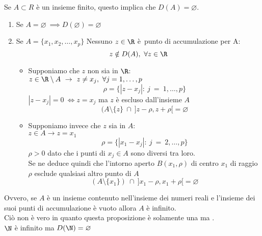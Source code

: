 \documentclass[../analisi.tex]{subfiles}
\begin{document}
\begin{dimo}
Se $A \subset R$ è un insieme finito, questo implica che $D(A) = \varnothing$.\\

\begin{enumerate}

\item 
Se $A = \varnothing\ \implies D(\varnothing) = \varnothing$

\item 
Se $A = \{ x_1, x_2, \dots, x_p \}$ Nessuno $ z \in \R$ 
è punto di accumulazione per A:
\begin{equation}
	z \notin D(A),\ \forall z \in \R
\end{equation}	

	\begin{itemize}
	\item 
	
	Supponiamo che $z$ non sia in $\R$: \\
	$ z \in \R \setminus A\ \to\ z \neq x_j,\ \forall j = 1, \dots, p$
	\begin{equation}
	\rho = \{ | z - x_j |:\ j\ =\ 1, \dots, p \}
	\end{equation}
	$ | z - x_j | = 0 \ \iff z = x_j $ ma $z$ è escluso dall'insieme $A$
	\begin{equation} 
		(A \setminus \{ z \}\ \cap\ ] z - \rho, z + \rho [ = \varnothing
	\end{equation}

	\item

	Supponiamo invece che $z$ sia in $A$:\\
	$ z \in A \to z = x_1$
	\begin{equation}
	\rho = \{  | x_1 - x_j | :\ j\ =\ 2, \dots, p \}
	\end{equation}
	$\rho > 0 $ dato che i punti di $x_j \in A$ sono diversi tra loro.\\
	Se ne deduce quindi che l'intorno aperto $B(x_1, \rho)$ di centro
	$x_1$ di raggio $\rho$ esclude qualsiasi altro punto di $A$
	\begin{equation}
	( A \setminus \{ x_1 \} )\ \cap\ ] x_1 - \rho, x_1 + \rho [ = \varnothing
	\end{equation}

	\end{itemize}
\end{enumerate}
\end{dimo}

\begin{esem}
Ovvero, se $A$ è un insieme contenuto nell'insieme dei numeri reali e 
l'insieme dei suoi punti di accumulazione  è vuoto allora $A$ 
è infinito.\\
Ciò non è vero in quanto questa proposizione è solamente una 
 ma . \\
$\N$ è infinito ma $D(\N) = \varnothing$
\end{esem}
\end{document}
